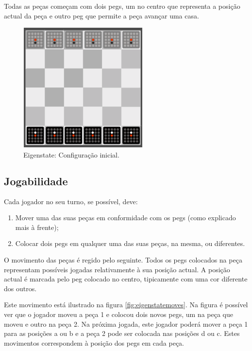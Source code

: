 \documentclass[paper=a4, fontsize=11pt]{scrartcl} %
\numberwithin{equation}{section} %
\numberwithin{figure}{section} %
\numberwithin{table}{section} %
\begin{document}
Todas as peças começam com dois pegs, um no centro que representa a posição actual da peça e outro peg que permite a peça avançar uma casa.

\begin{figure}[tb]
	\centering
	\includegraphics{eigenstate}
	\caption[Eigenstate Setup Inicial]{Eigenstate: Configuração inicial. \cite{eigenstaterules:2018}} %
	\label{fig:eigenstatestup} 
\end{figure}

\subsection{Jogabilidade}

Cada jogador no seu turno, se possível, deve:

\begin{enumerate}
	\item Mover uma das suas peças em conformidade com os pegs (como explicado mais à frente);
	\item Colocar dois pegs em qualquer uma das suas peças, na mesma, ou diferentes.
\end{enumerate}

O movimento das peças é regido pelo seguinte. Todos os pegs colocados na peça representam possíveis jogadas relativamente à sua posição actual. A posição actual é marcada pelo peg colocado no centro, tipicamente com uma cor diferente dos outros.

Este movimento está ilustrado na figura \ref{fig:eigenstatemoves}. Na figura é possível ver que o jogador moveu a peça 1 e colocou dois novos pegs, um na peça que moveu e outro na peça 2. Na próxima jogada, este jogador poderá mover a peça 1 para as posições a ou b e a peça 2 pode ser colocada nas posições d ou c. Estes movimentos correspondem à posição dos pegs em cada peça.
\end{document}
